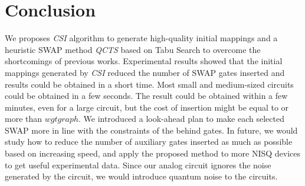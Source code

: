 \documentclass[runningheads]{llncs}
\begin{document}
\section{Conclusion}
\label{Conclusion}
We proposes \textit{CSI} algorithm to generate high-quality initial mappings and a heuristic SWAP method \textit{QCTS} based on Tabu Search to overcome the shortcomings of previous works.
Experimental results showed that
the initial mappings generated by \textit{CSI} reduced the number of SWAP gates inserted
and results could be obtained in a short time.
Most small and medium-sized circuits could be obtained in a few seconds.
The result could be obtained within a few minutes, even for a large circuit,
but the cost of insertion might be equal to or more than $wgtgraph$.
We introduced a look-ahead plan to make each selected SWAP more in line with the constraints of the behind gates.
In future, we would study how to reduce the number of auxiliary gates inserted as much as possible based on increasing speed,
and apply the proposed method to more NISQ devices to get useful experimental data.
Since our analog circuit ignores the noise generated by the circuit,
we would introduce quantum noise to the circuits.



\newpage
\appendix
\end{document}
